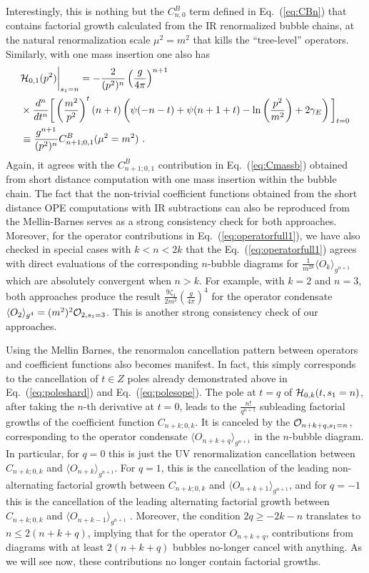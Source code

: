 \documentclass[a4paper,11pt]{article}
\begin{document}
Interestingly, this is nothing but the $C^B_{n,0}$ term defined in Eq.~(\ref{eq:CBn}) that contains factorial growth calculated from the IR renormalized bubble chains, at the natural renormalization scale $\mu^2=m^2$ that kills the ``tree-level'' operators.
Similarly, with one mass insertion one also has
\begin{align}
&{\cal H}_{0,1}(p^2)\bigg|_{s_1=n}=-\frac{2}{(p^2)^n}\left(\frac{g}{4\pi}\right)^{n+1} \nonumber \\ 
&\times\frac{d^n}{dt^n} \bigg[\left(\frac{m^2}{p^2}\right)^t(n+t)\left(\psi(-n-t)+\psi(n+1+t)-\ln \left(\frac{p^2}{m^2}\right)+2 \gamma_E \right)\bigg]_{t=0} \nonumber \\ 
& \equiv \frac{g^{n+1}}{(p^2)^n}C_{n+1;0,1}^{B}(\mu^2=m^2) \ .
\end{align}
Again, it agrees with the $C_{n+1;0,1}^B$ contribution in Eq.~(\ref{eq:Cmassb}) obtained from short distance computation with one mass insertion within the bubble chain. The fact that the non-trivial coefficient functions obtained from the short distance OPE computations with IR subtractions can also be reproduced from the Mellin-Barnes serves as a strong consistency check for both approaches. Moreover, for the operator contributions in Eq.~(\ref{eq:operatorfull1}), we have also checked in special cases with $k<n<2k$ that the Eq.~(\ref{eq:operatorfull1}) agrees with direct evaluations of the corresponding $n$-bubble diagrams for $\frac{1}{m^{2k}}\langle O_{k}\rangle_{g^{n+1}}$ which are absolutely convergent when $n>k$. For example, with $k=2$ and $n=3$, both approaches produce the result $\frac{9\zeta_3}{2m^2}(\frac{g}{4\pi})^4$ for the operator condensate $\langle O_2\rangle_{g^4}=(m^2)^2{\cal O}_{2,s_1=3}$. This is another strong consistency check of our approaches. 

Using the Mellin Barnes, the renormalon cancellation pattern between operators and coefficient functions also becomes manifest. In fact, this simply corresponds to the cancellation of $t\in {Z}$ poles already demonstrated above in Eq.~(\ref{eq:poleshard}) and Eq.~(\ref{eq:polesope}). The pole at $t=q$ of ${\cal H}_{0,k}(t,s_1=n)$, after taking the $n$-th derivative at $t=0$, leads to the $\frac{n!}{q^{n+1}}$ subleading factorial growths of the coefficient function $C_{n+k;0,k}$. It is canceled by the ${\cal O}_{n+k+q,s_1=n}$, corresponding to the operator condensate $\langle O_{n+k+q}\rangle_{g^{n+1}}$ in the $n$-bubble diagram. In particular, for $q=0$ this is just the UV renormalization cancellation between $C_{n+k;0,k}$ and $\langle O_{n+k}\rangle_{g^{n+1}}$. For $q=1$, this is the cancellation of the leading non-alternating factorial growth between $C_{n+k;0,k}$ and $\langle O_{n+k+1}\rangle_{g^{n+1}}$, and for $q=-1$ this is the cancellation of the leading alternating factorial growth between $C_{n+k;0,k}$ and $\langle O_{n+k-1}\rangle_{g^{n+1}}$ . Moreover, the condition $2q\ge -2k-n$ translates to $n\le 2(n+k+q)$, implying that for the operator $O_{n+k+q}$, contributions from diagrams with at least $2(n+k+q)$ bubbles no-longer cancel with anything. As we will see now, these contributions no longer contain factorial growths.
\end{document}
